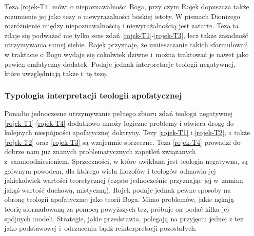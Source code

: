 Teza \eqref{rojek-T4} mówi o niepoznawalności Boga, przy czym Rojek dopuszcza także rozumienie jej jako tezy o niewyrażalności boskiej istoty. W pismach Dionizego rozróżnienie między niepoznawalnością i niewyrażalnością jest zatarte. Teza ta zdaje się podważać nie tylko sens zdań \eqref{rojek-T1}-\eqref{rojek-T3}, lecz także zasadność utrzymywania samej siebie.
Rojek przyznaje, że umieszczanie
takich sformułowań w traktacie o Bogu wydaje się cokolwiek dziwne i~można traktować je nawet jako pewien emfatyczny dodatek. Podaje jednak
interpretacje teologii negatywnej, które uwzględniają także i~tę tezę.




\subsubsection{Typologia interpretacji teologii apofatycznej}








Ponadto jednoczesne utrzymywanie pełnego zbioru zdań teologii negatywnej \eqref{rojek-T1}-\eqref{rojek-T4}
dodatkowo mnoży logiczne problemy i otwiera drogę do kolejnych niespójności
apofatycznej doktryny.
Tezy \eqref{rojek-T1} i \eqref{rojek-T2}, a także \eqref{rojek-T2} oraz \eqref{rojek-T3} są
wzajemnie sprzeczne. Teza \eqref{rojek-T4} prowadzi do dobrze nam już znanych problematycznych
zapętleń związanych z~saamoodniesieniem. Sprzeczności, w które uwikłana jest teologia
negatywna, są głównym powodem, dla którego wielu filozofów i teologów
odmawia jej jakiekolwiek wartości teoretycznej (często jednocześnie przyznając jej w~zamian
jakąś wartość duchową, mistyczną). 
Rojek podaje jednak pewne sposoby na obronę teologii apofatycznej jako teorii Boga.
Mimo problemów, jakie nękają teorię sformułowaną za pomocą powyższych
tez, próbuje on podać kilka jej spójnych modeli. Strategie, jakie
przedstawia, polegają na przyjęciu jednej z tez jako podstawowej
i~odrzuceniu bądź reinterpretacji pozostałych.



